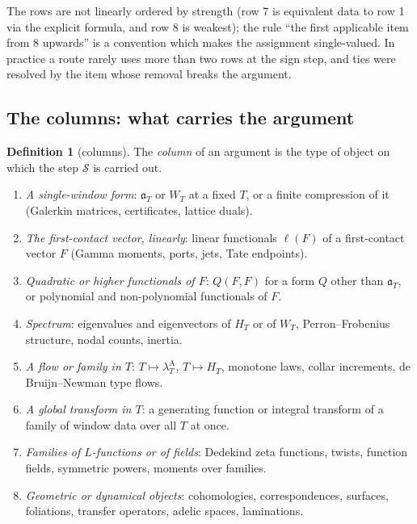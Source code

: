 \documentclass[11pt]{amsart}
\theoremstyle{definition}
\newtheorem{definition}[theorem]{Definition}
\theoremstyle{remark}
\newcommand{\lamA}{\lambda^{\mathrm A}_T}
\begin{document}
The rows are not linearly ordered by strength (row 7 is equivalent data to row 1 via the explicit
formula, and row 8 is weakest); the rule ``the first applicable item from 8 upwards'' is a convention
which makes the assignment single-valued. In practice a route rarely uses more than two rows at the
sign step, and ties were resolved by the item whose removal breaks the argument.

\subsection{The columns: what carries the argument}
\begin{definition}[columns]\label{def:cols}
The \emph{column} of an argument is the type of object on which the step $\mathcal S$ is carried out.
\begin{enumerate}
\item[\textbf{A.}] \emph{A single-window form}: $\mathfrak a_T$ or $W_T$ at a fixed $T$, or a finite
 compression of it (Galerkin matrices, certificates, lattice duals).
\item[\textbf{B.}] \emph{The first-contact vector, linearly}: linear functionals $\ell(F)$ of a
 first-contact vector $F$ (Gamma moments, ports, jets, Tate endpoints).
\item[\textbf{C.}] \emph{Quadratic or higher functionals of $F$}: $Q(F,F)$ for a form $Q$ other than
 $\mathfrak a_T$, or polynomial and non-polynomial functionals of $F$.
\item[\textbf{D.}] \emph{Spectrum}: eigenvalues and eigenvectors of $H_T$ or of $W_T$, Perron--Frobenius
 structure, nodal counts, inertia.
\item[\textbf{E.}] \emph{A flow or family in $T$}: $T\mapsto\lamA$, $T\mapsto H_T$, monotone laws,
 collar increments, de Bruijn--Newman type flows.
\item[\textbf{F.}] \emph{A global transform in $T$}: a generating function or integral transform of a
 family of window data over all $T$ at once.
\item[\textbf{G.}] \emph{Families of $L$-functions or of fields}: Dedekind zeta functions, twists,
 function fields, symmetric powers, moments over families.
\item[\textbf{H.}] \emph{Geometric or dynamical objects}: cohomologies, correspondences, surfaces,
 foliations, transfer operators, adelic spaces, laminations.
\end{enumerate}
\end{definition}
\end{document}
